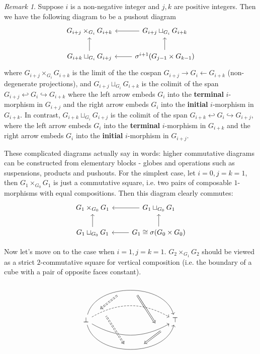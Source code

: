 \documentclass{article}
\theoremstyle{definition}
\theoremstyle{remark}
\newtheorem*{remark}{Remark}
\begin{document}
\begin{remark}
Suppose $i$ is a non-negative integer and $j,k$ are positive integers. Then we have the following diagram to be a pushout diagram $$ \begin{tikzcd} G_{i+j} \times_{G_i} G_{i+k} & G_{i+j} \sqcup_{G_i} G_{i+k} \arrow[l] \\ G_{i+k} \sqcup_{G_i} G_{i+j} \arrow[u] & \sigma^{i+1}(G_{j-1} \times G_{k-1})  \arrow[l] \arrow[u] \end{tikzcd}$$ where $G_{i+j} \times_{G_i} G_{i+k} $ is the limit of the the cospan $G_{i+j}\to G_{i} \leftarrow G_{i+k}$ (non-degenerate projections), and $G_{i+j} \sqcup_{G_i} G_{i+k} $ is the colimit of the span $G_{i+j} \hookleftarrow G_i \hookrightarrow G_{i+k} $ where the left arrow embeds $G_i$ into the \textbf{terminal} $i$-morphism in $G_{i+j}$ and the right arrow embeds $G_i$ into the \textbf{initial} $i$-morphism in $G_{i+k}$. In contrast, $G_{i+k} \sqcup_{G_i} G_{i+j}$ is the colimit of the span $G_{i+k} \hookleftarrow G_i \hookrightarrow G_{i+j}$, where the left arrow embeds $G_i$ into the \textbf{terminal} $i$-morphism in $G_{i+k}$ and the right arrow embeds $G_i$ into the \textbf{initial} $i$-morphism in $G_{i+j}$.

These complicated diagrams actually say in words: higher commutative diagrams can be constructed from elementary blocks - globes and operations such as suspensions, products and pushouts. For the simplest case, let $i=0,j=k=1$, then $G_1 \times_{G_0} G_1$ is just a commutative square, i.e. two pairs of composable $1$-morphisms with equal compositions. Then this diagram clearly commutes: $$\begin{tikzcd} G_{1} \times_{G_0} G_{1} & G_{1} \sqcup_{G_0} G_{1} \arrow[l] \\ G_{1} \sqcup_{G_0} G_{1} \arrow[u] & G_1 \cong \sigma(G_{0} \times G_{0})  \arrow[l] \arrow[u] \end{tikzcd}$$

Now let's move on to the case when $i=1,j=k=1$. $G_2 \times_{G_1} G_2$ should be viewed as a strict $2$-commutative square for vertical composition (i.e. the boundary of a cube with a pair of opposite faces constant).
$$ \begin{tikzcd}[column sep=huge,row sep=huge] 
\phantom{a} 
& \phantom{a} 
    \arrow[Rightarrow,rdd,shorten <=10pt,shorten >=45pt]   
    \arrow[Rightarrow,ld,dashed,shorten <=15pt,shorten >=15pt] 
& \phantom{a} \\ 
{\bot} 
    \arrow[rr, bend left,dashed] 
    \arrow[rr, bend left=75] 
    \arrow[rr, bend right] 
    \arrow[rr, bend right=75] 
& 
& {\top} 
    \arrow[Rightarrow,ld,shorten <=15pt,shorten >=15pt]    \\ 
\phantom{a}  
& \phantom{a} 
    \arrow[Leftarrow,luu,dashed,shorten <=10pt,shorten >=45pt]  
& \phantom{a} 
\end{tikzcd}  $$


\end{remark}
\end{document}
